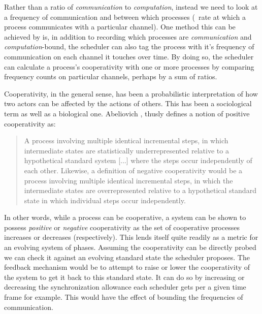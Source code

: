 Rather than a ratio of {\em communication} to {\em computation}, instead we need to look at a 
frequency of communication and between which processes (\ie~rate at which a process communicates with a particular
channel). One method this can be achieved by is, in addition to recording which processes are {\em communication} and 
{\em computation}-bound, the scheduler can also tag the process with it's frequency of communication on each 
channel it touches over time. By doing so, the scheduler can calculate a process's cooperativity with one or more
processes by comparing frequency counts on particular channels, perhaps by a sum of ratios.

Cooperativity, in the general sense, has been a probabilistic interpretation of how two actors can be affected by the actions of
others. This has been a sociological term as well as a biological one. Abeliovich \cite{abeliovich2005empirical}, thusly defines a
notion of positive cooperativity as: 
\begin{quote}
A process involving multiple identical incremental steps, in which intermediate states are statistically underrepresented relative to a hypothetical standard system [...] where the steps occur independently of each other. Likewise, a definition of negative cooperativity would be a process involving multiple identical incremental steps, in which the intermediate states are overrepresented relative to a hypothetical standard state in which individual steps occur independently.
\end{quote}

In other words, while a process can be cooperative, a system can be shown to possess {\em positive} or {\em negative}
cooperativity as the set of cooperative processes increases or decreases (respectively). This lends itself quite 
readily as a metric for an evolving system of phases. Assuming the cooperativity can be directly probed we can check 
it against an evolving standard state the scheduler proposes. The feedback mechanism would be to attempt to raise or
lower the cooperativity of the system to get it back to this standard state. It can do so by increasing or decreasing
the synchronization allowance each scheduler gets per a given time frame for example. This would have the effect of 
bounding the frequencies of communication.


